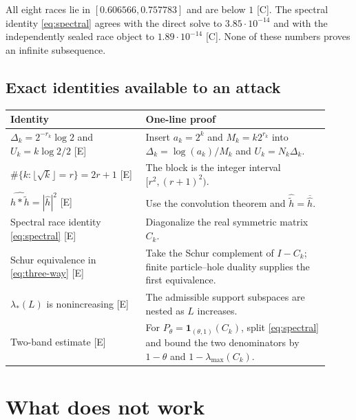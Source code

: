 \documentclass[11pt]{article}
\newcommand{\Egrade}{\textnormal{\small[E]}}
\newcommand{\Cgrade}{\textnormal{\small[C]}}
\begin{document}
\noindent
All eight races lie in $[0.606566,0.757783]$ and are below $1$
\Cgrade.  The spectral identity \eqref{eq:spectral} agrees with the
direct solve to $3.85\cdot10^{-14}$ and with the independently
sealed race object to $1.89\cdot10^{-14}$ \Cgrade.  None of these
numbers proves an infinite subsequence.

\subsection{Exact identities available to an attack}

\begin{longtable}{@{}p{0.39\linewidth}p{0.53\linewidth}@{}}
\toprule
Identity & One-line proof\\
\midrule
\endhead
$\Delta_k=2^{-r_k}\log2$ and
$U_k=k\log2/2$ \Egrade &
Insert $a_k=2^k$ and $M_k=k2^{r_k}$ into
$\Delta_k=\log(a_k)/M_k$ and $U_k=N_k\Delta_k$.\\
\addlinespace
$\#\{k:\lfloor\sqrt{k}\rfloor=r\}=2r+1$ \Egrade &
The block is the integer interval $[r^2,(r+1)^2)$.\\
\addlinespace
$\widehat{h*\widetilde h}=|\widehat h|^2$ \Egrade &
Use the convolution theorem and
$\widehat{\widetilde h}=\overline{\widehat h}$.\\
\addlinespace
Spectral race identity \eqref{eq:spectral} \Egrade &
Diagonalize the real symmetric matrix $C_k$.\\
\addlinespace
Schur equivalence in \eqref{eq:three-way} \Egrade &
Take the Schur complement of $I-C_k$; finite
particle--hole duality supplies the first equivalence.\\
\addlinespace
$\lambda_*(L)$ is nonincreasing \Egrade &
The admissible support subspaces are nested as $L$ increases.\\
\addlinespace
Two-band estimate \Egrade &
For $P_\theta=\mathbf1_{(\theta,1)}(C_k)$, split
\eqref{eq:spectral} and bound the two denominators by
$1-\theta$ and $1-\lambda_{\max}(C_k)$.\\
\bottomrule
\end{longtable}

\section{What does not work}
\end{document}

